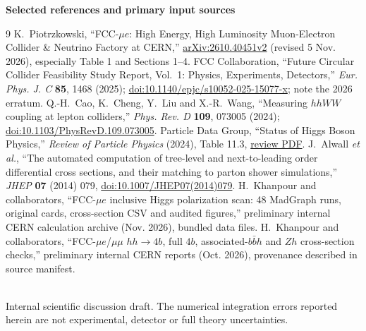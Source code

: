 \documentclass[12pt,a4paper]{article}
\begin{document}
\vspace{2pt}\noindent\textbf{Selected references and primary input sources}
\begin{thebibliography}{9}\setlength{\itemsep}{1pt}\small
{} K.~Piotrzkowski, ``FCC-$\mu e$: High Energy, High Luminosity Muon-Electron Collider \& Neutrino Factory at CERN,'' \href{https://arxiv.org/abs/2610.40451}{arXiv:2610.40451v2} (revised 5 Nov. 2026), especially Table 1 and Sections 1--4.
 FCC Collaboration, ``Future Circular Collider Feasibility Study Report, Vol.~1: Physics, Experiments, Detectors,'' \emph{Eur. Phys. J. C} \textbf{85}, 1468 (2025); \href{https://doi.org/10.1140/epjc/s10052-025-15077-x}{doi:10.1140/epjc/s10052-025-15077-x}; note the 2026 erratum.
 Q.-H.~Cao, K.~Cheng, Y.~Liu and X.-R.~Wang, ``Measuring $hhWW$ coupling at lepton colliders,'' \emph{Phys. Rev. D} \textbf{109}, 073005 (2024); \href{https://doi.org/10.1103/PhysRevD.109.073005}{doi:10.1103/PhysRevD.109.073005}.
 Particle Data Group, ``Status of Higgs Boson Physics,'' \emph{Review of Particle Physics} (2024), Table 11.3, \href{https://pdgweb.lbl.gov/2024/reviews/rpp2024-rev-higgs-boson.pdf}{review PDF}.
 J.~Alwall \emph{et al.}, ``The automated computation of tree-level and next-to-leading order differential cross sections, and their matching to parton shower simulations,'' \emph{JHEP} \textbf{07} (2014) 079, \href{https://doi.org/10.1007/JHEP07(2014)079}{doi:10.1007/JHEP07(2014)079}.
 H.~Khanpour and collaborators, ``FCC-$\mu e$ inclusive Higgs polarization scan: 48 MadGraph runs, original cards, cross-section CSV and audited figures,'' preliminary internal CERN calculation archive (Nov. 2026), bundled data files.
 H.~Khanpour and collaborators, ``FCC-$\mu e$/$\mu\mu$ $hh\to4b$, full $4b$, associated-$b\bar bh$ and $Zh$ cross-section checks,'' preliminary internal CERN reports (Oct. 2026), provenance described in source manifest.
\end{thebibliography}

\vfill
\noindent{\color{aghgreen}\rule{\linewidth}{1pt}}\\[-2pt]
{\footnotesize\color{gray}Internal scientific discussion draft. The numerical integration errors reported herein are not experimental, detector or full theory uncertainties.}
\end{document}
